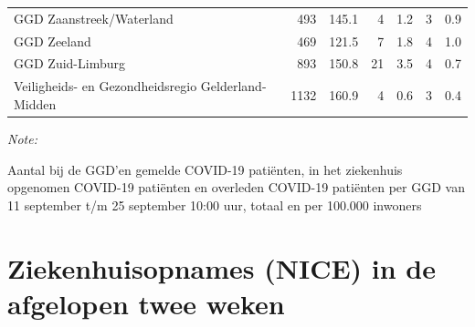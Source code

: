 \documentclass[
  english,
  man,floatsintext]{apa6}
\begin{document}
\begin{table}
\begin{threeparttable}
\begin{tabular}{lrrrrrr}
GGD Zaanstreek/Waterland & 493 & 145.1 & 4 & 1.2 & 3 & 0.9\\
GGD Zeeland & 469 & 121.5 & 7 & 1.8 & 4 & 1.0\\
GGD Zuid-Limburg & 893 & 150.8 & 21 & 3.5 & 4 & 0.7\\
Veiligheids- en Gezondheidsregio Gelderland-Midden & 1132 & 160.9 & 4 & 0.6 & 3 & 0.4\\
\bottomrule
\end{tabular}
\begin{tablenotes}
\item \textit{Note: } 
\item Aantal bij de GGD’en gemelde COVID-19 patiënten, in het ziekenhuis opgenomen COVID-19 patiënten en overleden COVID-19 patiënten per GGD van 11 september t/m 25 september 10:00 uur, totaal en per 100.000 inwoners
\end{tablenotes}
\end{threeparttable}
\endgroup{}
\end{table}

\newpage

\hypertarget{ziekenhuisopnames-nice-in-de-afgelopen-twee-weken}{%
\section{Ziekenhuisopnames (NICE) in de afgelopen twee weken}\label{ziekenhuisopnames-nice-in-de-afgelopen-twee-weken}}
\end{document}
